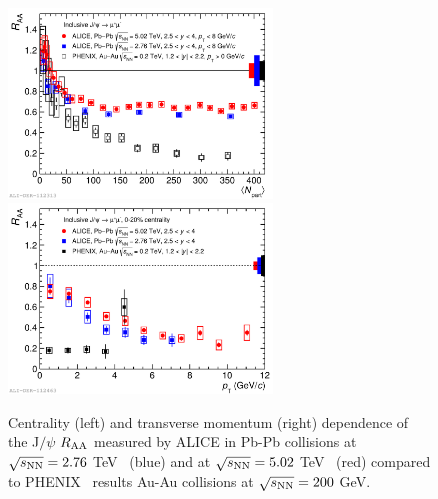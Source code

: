 \begin{figure}[!ht]
  \centering
  \includegraphics[width=7cm]{FigCap1/RaaJPsiAlicePhenix.pdf}
  \includegraphics[width=7cm]{FigCap1/RaaJPsiAlicePhenixVsPt.pdf}
  \caption{Centrality (left) and transverse momentum (right) dependence of the J$/\psi$ $R_{\rm AA}$ measured by ALICE in Pb-Pb collisions at $\sqrt{s_{\rm NN}} = 2.76$ TeV~\cite{Abelev:2013ila} (blue) and at $\sqrt{s_{\rm NN}} = 5.02$ TeV~\cite{Adam:2016rdg} (red) compared to PHENIX~\cite{Adare:2011yf} results Au-Au collisions at $\sqrt{s_{\rm NN}} = 200$ GeV.}
  \label{fig:RaaJPsi}
\end{figure}

